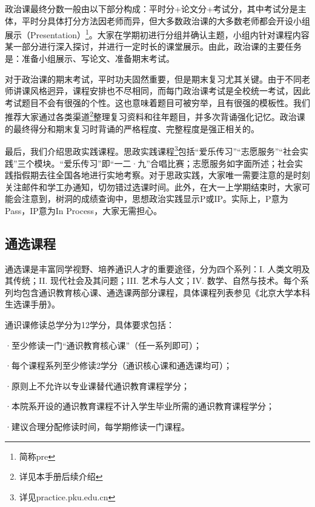 \vspace{10pt}

政治课最终分数一般由以下部分构成：平时分+论文分+考试分，其中考试分是主体，平时分具体打分方法因老师而异，但大多数政治课的大多数老师都会开设小组展示（Presentation）\footnote{简称pre}。大家在学期初进行分组并确认主题，小组内针对课程内容某一部分进行深入探讨，并进行一定时长的课堂展示。由此，政治课的主要任务是：准备小组展示、写论文、准备期末考试。

\vspace{10pt}

对于政治课的期末考试，平时功夫固然重要，但是期末复习尤其关键。由于不同老师讲课风格迥异，课程安排也不尽相同，而每门政治课考试是全校统一考试，因此考试题目不会有很强的个性。这也意味着题目可被穷举，且有很强的模板性。我们推荐大家通过各类渠道\footnote{详见本手册后续介绍}整理复习资料和往年题目，并多次背诵强化记忆。政治课的最终得分和期末复习时背诵的严格程度、完整程度是强正相关的。

\vspace{10pt}

最后，我们介绍思政实践课程。思政实践课程\footnote{详见practice.pku.edu.cn}包括“爱乐传习”“志愿服务”“社会实践”三个模块。“爱乐传习”即“一二·九”合唱比赛；志愿服务如字面所述；社会实践指假期去往全国各地进行实地考察。对于思政实践，大家唯一需要注意的是时刻关注邮件和学工办通知，切勿错过选课时间。此外，在大一上学期结束时，大家可能会注意到，树洞的成绩查询中，思想政治实践显示P或IP。实际上，P意为Pass，IP意为In Process，大家无需担心。

\subsection{通选课程}
通选课是丰富同学视野、培养通识人才的重要途径，分为四个系列：I. 人类文明及其传统；II. 现代社会及其问题；III. 艺术与人文；IV. 数学、自然与技术。每个系列均包含通识教育核心课、通选课两部分课程，具体课程列表参见《北京大学本科生选课手册》。

\vspace{10pt}

通识课修读总学分为12学分，具体要求包括：

·至少修读一门“通识教育核心课”（任一系列即可）；

·每个课程系列至少修读2学分（通识核心课和通选课均可）；

·原则上不允许以专业课替代通识教育课程学分；

·本院系开设的通识教育课程不计入学生毕业所需的通识教育课程学分；

·建议合理分配修读时间，每学期修读一门课程。

